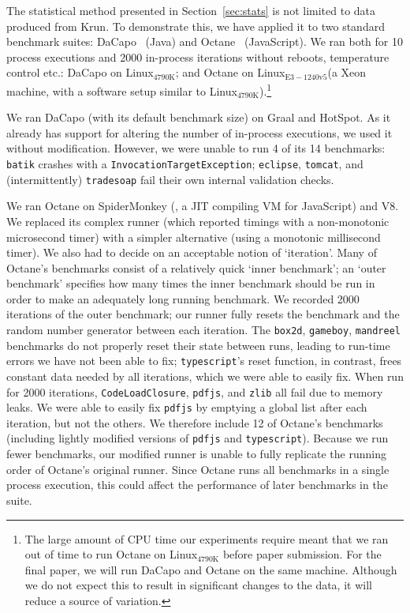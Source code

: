 \documentclass[preprint,numbers,10pt]{sigplanconf}
\newcommand{\bencherthree}{Linux$_\mathrm{4790K}$\xspace}
\newcommand{\bencherseven}{Linux$_\mathrm{E3-1240v5}$\xspace}
\begin{document}
The statistical method presented in Section~\ref{sec:stats} is not limited to data
produced from Krun. To demonstrate this, we have applied it to two standard
benchmark suites: DaCapo~\cite{dacapo06} (Java) and Octane~\cite{octane}
(JavaScript). We ran both for 10 process executions and 2000 in-process
iterations without reboots, temperature control etc.: DaCapo on \bencherthree;
and Octane on \bencherseven (a Xeon machine, with a software setup
similar to \bencherthree).\footnote{The large amount of CPU time our
experiments require meant that we ran out of time to run Octane on \bencherthree
before paper submission. For the final paper, we will run DaCapo and Octane on
the same machine. Although we do not expect this to result in significant
changes to the data, it will reduce a source of variation.}

We ran DaCapo (with its default benchmark size) on Graal and HotSpot. As it already has support for
altering the number of in-process executions, we used it without modification.
However, we were unable to run 4 of its 14 benchmarks: \texttt{batik}
crashes with a \texttt{Invocation\-Target\-Exception}; \texttt{eclipse},
\texttt{tomcat}, and (intermittently) \texttt{tradesoap} fail their own internal
validation checks.

We ran Octane on SpiderMonkey (\spidermonkeyversion, a JIT compiling VM for JavaScript) and V8.
We replaced its complex runner (which reported timings with a non-monotonic
microsecond timer) with a simpler alternative (using a monotonic millisecond
timer). We also had to decide on an acceptable notion of `iteration'. Many of Octane's
benchmarks consist of a relatively quick `inner benchmark'; an `outer benchmark'
specifies how many times the inner benchmark should be run in order to make an
adequately long running benchmark. We recorded 2000 iterations of the outer benchmark; our runner
fully resets the benchmark and the random number generator between each
iteration. The \texttt{box2d}, \texttt{gameboy}, \texttt{mandreel} benchmarks do
not properly reset their state between runs, leading to run-time errors we have
not been able to fix; \texttt{typescript}'s reset function, in contrast,
frees constant data needed by all iterations, which we were able
to easily fix. When run for 2000 iterations, \texttt{CodeLoadClosure},
\texttt{pdfjs}, and \texttt{zlib} all fail due to memory leaks. We were able to
easily fix \texttt{pdfjs} by emptying a global list after each iteration, but not the
others. We therefore include 12 of Octane's benchmarks (including lightly
modified versions of \texttt{pdfjs} and \texttt{typescript}).
Because we run fewer benchmarks, our modified runner is unable to fully
replicate the running order of Octane's original runner. Since Octane runs all
benchmarks in a single process execution, this could affect the performance of
later benchmarks in the suite.
\end{document}
